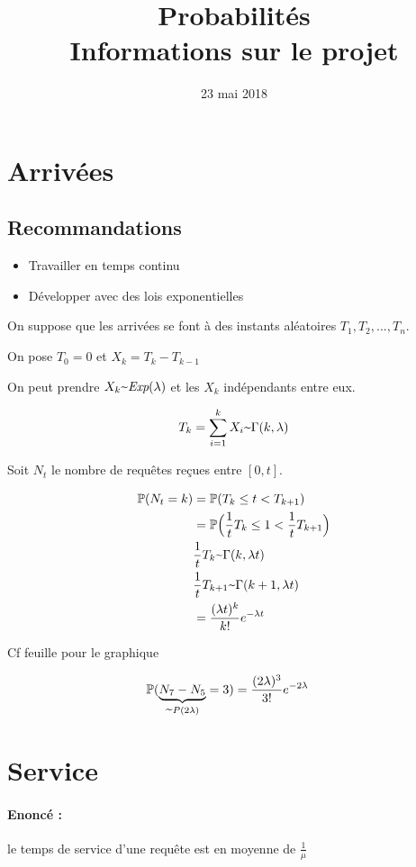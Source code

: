 \documentclass{article}
\title{%
  Probabilités \\
  \large Informations sur le projet}
\date{23 mai 2018}
\newcommand{\textapprox}{\raisebox{0.5ex}{\texttildelow}}
\begin{document}
\maketitle

\section{Arrivées}
\subsection{Recommandations}
\begin{itemize}
  \item Travailler en temps continu
  \item Développer avec des lois exponentielles
\end{itemize}

On suppose que les arrivées se font à des instants aléatoires $T_1,T_2,...,T_n$.

On pose $T_0=0$ et $X_k = T_k - T_{k-1}$

On peut prendre $X_k \textapprox \textit{Exp}(\lambda)$ et les $X_k$ indépendants entre eux.

$$ T_k = \sum_{i=1}^k X_i \textapprox \Gamma(k, \lambda)$$

Soit $N_t$ le nombre de requêtes reçues entre $[0,t]$.

\begin{align*}
  \mathbb{P}(N_t = k) &= \mathbb{P}(T_k \leq t < T_{k+1}) \\
  &= \mathbb{P}\Big( \frac{1}{t}T_k \leq 1 < \frac{1}{t}T_{k+1}\Big) \\
  & \frac{1}{t}T_k \textapprox \Gamma(k, \lambda t)  \\
  & \frac{1}{t}T_{k+1} \textapprox \Gamma(k+1, \lambda t) \\
  &= \frac{(\lambda t)^k}{k!}e^{-\lambda t}
\end{align*}

Cf feuille pour le graphique

\begin{align*}
  \mathbb{P}(\underbrace{N_7-N_5}_{\textapprox P(2 \lambda)} = 3) &= \frac{(2 \lambda)^3}{3!}e^{-2\lambda}
\end{align*}

\section{Service}
\paragraph{Enoncé :} le temps de service d'une requête est en moyenne de $\frac{1}{\mu}$
\end{document}
